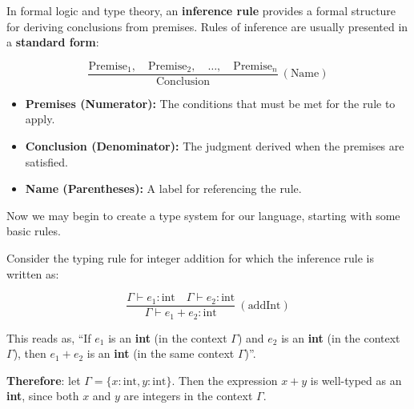 \newpage 

\begin{Def}

    In formal logic and type theory, an \textbf{inference rule} provides a formal structure for deriving conclusions from premises. 
    Rules of inference are usually presented in a \textbf{standard form}: \Large

    \[
    \frac{\text{Premise}_1, \quad \text{Premise}_2, \quad \ldots, \quad \text{Premise}_n}{\text{Conclusion}} \ (\text{Name})
    \]

    \normalsize
    \begin{itemize}
        \item \textbf{Premises (Numerator):} The conditions that must be met for the rule to apply.
        \item \textbf{Conclusion (Denominator):} The judgment derived when the premises are satisfied.
        \item \textbf{Name (Parentheses):} A label for referencing the rule. \hfill \cite{wiki:rule_of_inference}
    \end{itemize}
\end{Def}

\noindent
Now we may begin to create a type system for our language, starting with some basic rules.
\begin{Example}

    \label{ex:integer_addition}
    Consider the typing rule for integer addition for which the inference rule is written as: \LARGE

    \[
    \frac{\Gamma \vdash e_1 : \text{int} \quad \Gamma \vdash e_2 : \text{int}}{\Gamma \vdash e_1 + e_2 : \text{int}} \ (\text{addInt})
    \]

    \vspace{.5em}
    \normalsize
    \noindent
    This reads as, ``If $e_1$ is an \textbf{int} (in the context $\Gamma$) and $e_2$ is an \textbf{int} 
    (in the context $\Gamma$), then $e_1 + e_2$ is an \textbf{int} (in the same context $\Gamma$)''.

    \vspace{1em}
    \noindent
    \textbf{Therefore}: let $\Gamma = \{x : \text{int}, y : \text{int}\}$. Then the expression $x + y$ is well-typed as an \textbf{int}, 
    since both $x$ and $y$ are integers in the context $\Gamma$.
\end{Example}

